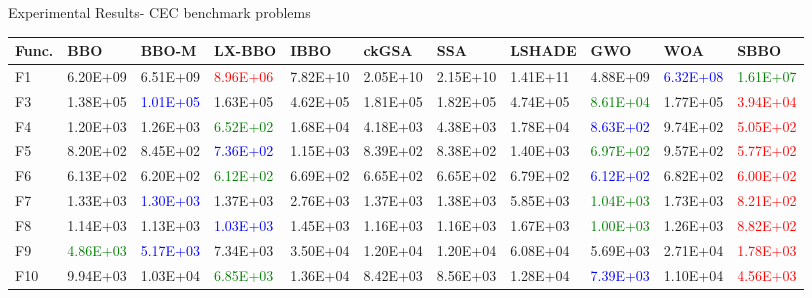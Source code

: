 \documentclass [9pt,times] {beamer}
\begin{document}
  
  
  
  
  
  
  
  
  
  
\begin{frame}{Experimental Results- CEC benchmark problems }
     
  \begin{center}
       \fontsize{4.3pt}{7.3pt}\selectfont
\begin{tabular}{p{0.08in}  p{0.25in} |  p{0.23in} |  p{0.25in}|  p{0.25in} |  p{0.25in} | p{0.25in} |  p{0.25in} | p{0.25in} |  p{0.25in} |  p{0.25in}}
    \hline
\textbf{Func.} 		&	 \textbf{BBO} 	&	 \textbf{BBO-M} &	 \textbf{LX-BBO} 	&	 \textbf{IBBO} 	&	 \textbf{ckGSA} 	&	 \textbf{SSA} 	&	\textbf{LSHADE} 	&	 \textbf{GWO} 	&	 \textbf{WOA} 	&	\textbf{SBBO} \\
\hline
F1	&	6.20E+09	&	6.51E+09	&\textcolor{red}{	8.96E+06	}&	7.82E+10	&	2.05E+10	&	2.15E+10	&	1.41E+11	&	4.88E+09	&\textcolor{blue}{	6.32E+08	}&\textcolor{green}{	1.61E+07	}\\
F3	&	1.38E+05	&\textcolor{blue}{	1.01E+05	}&	1.63E+05	&	4.62E+05	&	1.81E+05	&	1.82E+05	&	4.74E+05	&\textcolor{green}{	8.61E+04	}&	1.77E+05	&\textcolor{red}{	3.94E+04	}\\
F4	&	1.20E+03	&	1.26E+03	&\textcolor{green}{	6.52E+02	}&	1.68E+04	&	4.18E+03	&	4.38E+03	&	1.78E+04	&\textcolor{blue}{	8.63E+02	}&	9.74E+02	&\textcolor{red}{	5.05E+02	}\\
F5	&	8.20E+02	&	8.45E+02	&\textcolor{blue}{	7.36E+02	}&	1.15E+03	&	8.39E+02	&	8.38E+02	&	1.40E+03	&\textcolor{green}{	6.97E+02	}&	9.57E+02	&\textcolor{red}{	5.77E+02	}\\
F6	&	6.13E+02	&	6.20E+02	&\textcolor{green}{	6.12E+02	}&	6.69E+02	&	6.65E+02	&	6.65E+02	&	6.79E+02	&\textcolor{blue}{	6.12E+02	}&	6.82E+02	&\textcolor{red}{	6.00E+02	}\\
F7	&	1.33E+03	&\textcolor{blue}{	1.30E+03	}&	1.37E+03	&	2.76E+03	&	1.37E+03	&	1.38E+03	&	5.85E+03	&\textcolor{green}{	1.04E+03	}&	1.73E+03	&\textcolor{red}{	8.21E+02	}\\
F8	&	1.14E+03	&	1.13E+03	&\textcolor{blue}{	1.03E+03	}&	1.45E+03	&	1.16E+03	&	1.16E+03	&	1.67E+03	&\textcolor{green}{	1.00E+03	}&	1.26E+03	&\textcolor{red}{	8.82E+02	}\\
F9	&\textcolor{green}{	4.86E+03	}&\textcolor{blue}{	5.17E+03	}&	7.34E+03	&	3.50E+04	&	1.20E+04	&	1.20E+04	&	6.08E+04	&	5.69E+03	&	2.71E+04	&\textcolor{red}{	1.78E+03	}\\
F10	&	9.94E+03	&	1.03E+04	&\textcolor{green}{	6.85E+03	}&	1.36E+04	&	8.42E+03	&	8.56E+03	&	1.28E+04	&\textcolor{blue}{	7.39E+03	}&	1.10E+04	&\textcolor{red}{	4.56E+03	}\\


\end{tabular}
\end{center}
\end{frame}
\end{document}
